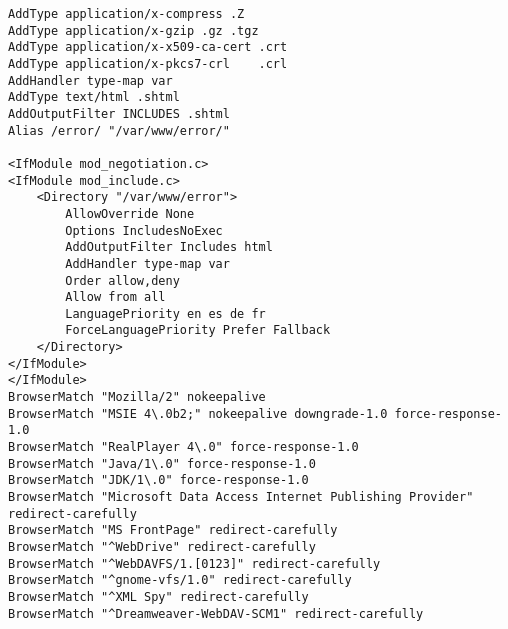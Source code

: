 \begin{code}
\begin{lstlisting}
AddType application/x-compress .Z
AddType application/x-gzip .gz .tgz
AddType application/x-x509-ca-cert .crt
AddType application/x-pkcs7-crl    .crl
AddHandler type-map var
AddType text/html .shtml
AddOutputFilter INCLUDES .shtml
Alias /error/ "/var/www/error/"

<IfModule mod_negotiation.c>
<IfModule mod_include.c>
    <Directory "/var/www/error">
        AllowOverride None
        Options IncludesNoExec
        AddOutputFilter Includes html
        AddHandler type-map var
        Order allow,deny
        Allow from all
        LanguagePriority en es de fr
        ForceLanguagePriority Prefer Fallback
    </Directory>
</IfModule>
</IfModule>
BrowserMatch "Mozilla/2" nokeepalive
BrowserMatch "MSIE 4\.0b2;" nokeepalive downgrade-1.0 force-response-1.0
BrowserMatch "RealPlayer 4\.0" force-response-1.0
BrowserMatch "Java/1\.0" force-response-1.0
BrowserMatch "JDK/1\.0" force-response-1.0
BrowserMatch "Microsoft Data Access Internet Publishing Provider" redirect-carefully
BrowserMatch "MS FrontPage" redirect-carefully
BrowserMatch "^WebDrive" redirect-carefully
BrowserMatch "^WebDAVFS/1.[0123]" redirect-carefully
BrowserMatch "^gnome-vfs/1.0" redirect-carefully
BrowserMatch "^XML Spy" redirect-carefully
BrowserMatch "^Dreamweaver-WebDAV-SCM1" redirect-carefully
\end{lstlisting}
\end{code}
